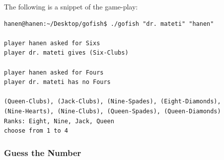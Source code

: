 \begin{enumerate}
The following is a snippet of the game-play:
\begin{verbatim}
hanen@hanen:~/Desktop/gofish$ ./gofish "dr. mateti" "hanen"

player hanen asked for Sixs
player dr. mateti gives (Six-Clubs)

player hanen asked for Fours
player dr. mateti has no Fours

(Queen-Clubs), (Jack-Clubs), (Nine-Spades), (Eight-Diamonds), 
(Nine-Hearts), (Nine-Clubs), (Queen-Spades), (Queen-Diamonds)
Ranks: Eight, Nine, Jack, Queen
choose from 1 to 4
\end{verbatim}
\end{enumerate}

\subsubsection{Guess the Number}
